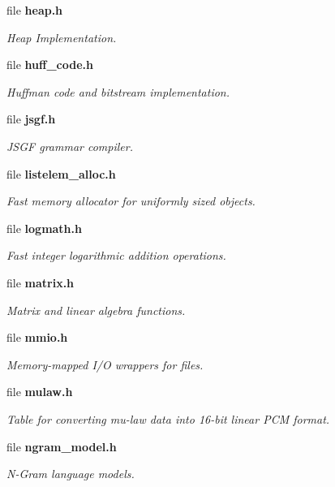 \begin{DoxyCompactItemize}
file {\bf heap.\+h}
\begin{DoxyCompactList}\small\item\em Heap Implementation. \end{DoxyCompactList}\item 
file {\bf huff\+\_\+code.\+h}
\begin{DoxyCompactList}\small\item\em Huffman code and bitstream implementation. \end{DoxyCompactList}\item 
file {\bf jsgf.\+h}
\begin{DoxyCompactList}\small\item\em J\+S\+G\+F grammar compiler. \end{DoxyCompactList}\item 
file {\bf listelem\+\_\+alloc.\+h}
\begin{DoxyCompactList}\small\item\em Fast memory allocator for uniformly sized objects. \end{DoxyCompactList}\item 
file {\bf logmath.\+h}
\begin{DoxyCompactList}\small\item\em Fast integer logarithmic addition operations. \end{DoxyCompactList}\item 
file {\bf matrix.\+h}
\begin{DoxyCompactList}\small\item\em Matrix and linear algebra functions. \end{DoxyCompactList}\item 
file {\bf mmio.\+h}
\begin{DoxyCompactList}\small\item\em Memory-\/mapped I/\+O wrappers for files. \end{DoxyCompactList}\item 
file {\bf mulaw.\+h}
\begin{DoxyCompactList}\small\item\em Table for converting mu-\/law data into 16-\/bit linear P\+C\+M format. \end{DoxyCompactList}\item 
file {\bf ngram\+\_\+model.\+h}
\begin{DoxyCompactList}\small\item\em N-\/\+Gram language models. \end{DoxyCompactList}\item 

\end{DoxyCompactItemize}
